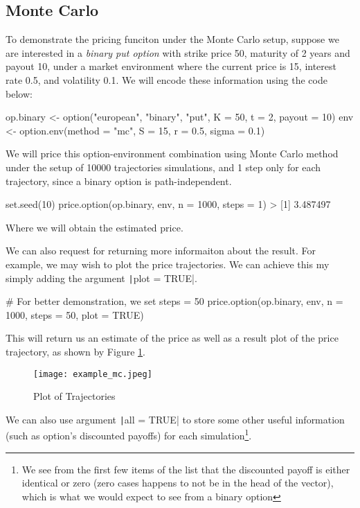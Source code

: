 \subsection{Monte Carlo}

To demonstrate the pricing funciton under the Monte Carlo setup, suppose we are interested in a \textit{binary put option} with strike price 50, maturity of 2 years and payout 10, under a market environment where the current price is 15, interest rate 0.5, and volatility 0.1. We will encode these information using the code below:

\begin{Rminted}
op.binary <- option("european", "binary", "put", K = 50, t = 2, payout = 10)
env <- option.env(method = "mc", S = 15, r = 0.5, sigma = 0.1)
\end{Rminted}

We will price this option-environment combination using Monte Carlo method under the setup of 10000 trajectories simulations, and 1 step only for each trajectory, since a binary option is path-independent.

\begin{Rminted}
set.seed(10)
price.option(op.binary, env, n = 1000, steps = 1)
> [1] 3.487497
\end{Rminted}

Where we will obtain the estimated price.

We can also request for returning more informaiton about the result. For example, we may wish to plot the price trajectories. We can achieve this my simply adding the argument \texttt|plot = TRUE|.

\begin{Rminted}
# For better demonstration, we set steps = 50
price.option(op.binary, env, n = 1000, steps = 50, plot = TRUE)
\end{Rminted}

This will return us an estimate of the price as well as a result plot of the price trajectory, as shown by Figure \ref{img:example_mc}.

\begin{figure}[H]
    \centering
    \texttt{[image: example\_mc.jpeg]}
    \caption{Plot of Trajectories} \label{img:example_mc}
\end{figure}

We can also use argument \texttt|all = TRUE| to store some other useful information (such as option's discounted payoffs) for each simulation\footnote{We see from the first few items of the list that the discounted payoff is either identical or zero (zero cases happens to not be in the head of the vector), which is what we would expect to see from a binary option}.

